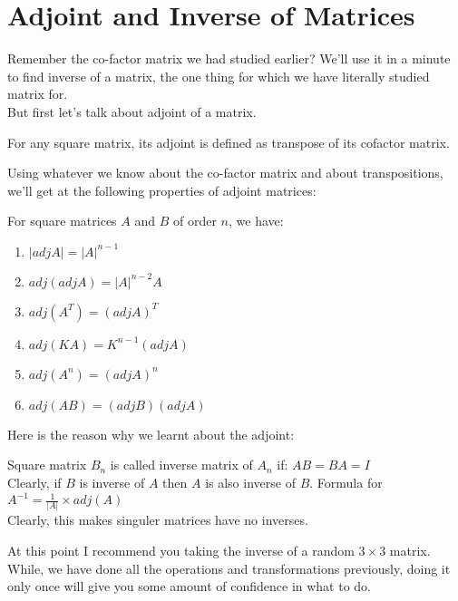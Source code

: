 \section{Adjoint and Inverse of Matrices}
Remember the co-factor matrix we had studied earlier? We'll use it in a minute to find inverse of a matrix, the one thing for which we have literally studied matrix for.\\
But first let's talk about adjoint of a matrix.\\
\begin{definition}
    For any square matrix, its adjoint is defined as transpose of its cofactor matrix.
\end{definition}
Using whatever we know about the co-factor matrix and about transpositions, we'll get at the following properties of adjoint matrices:\\
\begin{theorem}
    For square matrices $A$ and $B$ of order $n$, we have:\\
    \begin{enumerate}
        \item $|adj A|= |A|^{n-1}$\\
        \item $adj(adj A)= |A|^{n-2}A$\\
        \item $adj(A^T)= (adj A)^T$\\
        \item $adj(KA)= K^{n-1}(adj A)$\\
        \item $adj(A^n)=(adj A)^n$\\
        \item $adj(AB)=(adj B)(adj A)$
    \end{enumerate}
\end{theorem}
Here is the reason why we learnt about the adjoint:\\
\begin{definition}
Square matrix $B_n$ is called inverse matrix of $A_n$ if:
$AB = BA = I$\\
Clearly, if $B$ is inverse of $A$ then $A$ is also inverse of $B$.
Formula for $A^{-1}= \frac{1}{|A|} \times adj(A)$\\
Clearly, this makes singuler matrices have no inverses.\\
\end{definition}
At this point I recommend you taking the inverse of a random $3 \times 3$ matrix. While, we have done all the operations and transformations previously, doing it only once will give you some amount of confidence in what to do.\\
